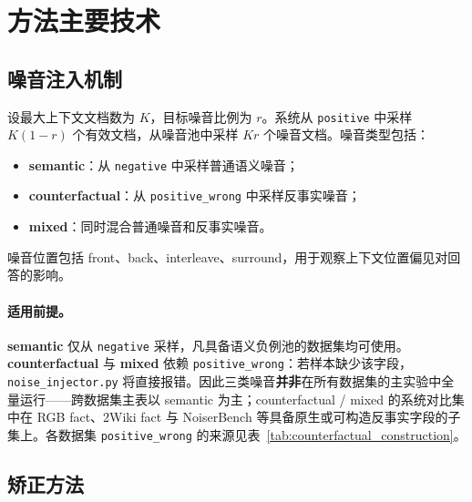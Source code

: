 \documentclass[UTF8,zihao=-4]{ctexart}
\begin{document}
\section{方法主要技术}

\subsection{噪音注入机制}
设最大上下文文档数为 $K$，目标噪音比例为 $r$。系统从 \texttt{positive} 中采样 $K(1-r)$ 个有效文档，从噪音池中采样 $Kr$ 个噪音文档。噪音类型包括：

\begin{itemize}
  \item \textbf{semantic}：从 \texttt{negative} 中采样普通语义噪音；
  \item \textbf{counterfactual}：从 \texttt{positive\_wrong} 中采样反事实噪音；
  \item \textbf{mixed}：同时混合普通噪音和反事实噪音。
\end{itemize}

噪音位置包括 front、back、interleave、surround，用于观察上下文位置偏见对回答的影响。

\paragraph{适用前提。} \textbf{semantic} 仅从 \texttt{negative} 采样，凡具备语义负例池的数据集均可使用。\textbf{counterfactual} 与 \textbf{mixed} 依赖 \texttt{positive\_wrong}：若样本缺少该字段，\texttt{noise\_injector.py} 将直接报错。因此三类噪音\textbf{并非}在所有数据集的主实验中全量运行——跨数据集主表以 semantic 为主；counterfactual / mixed 的系统对比集中在 RGB fact、2Wiki fact 与 NoiserBench 等具备原生或可构造反事实字段的子集上。各数据集 \texttt{positive\_wrong} 的来源见表~\ref{tab:counterfactual_construction}。

\subsection{矫正方法}
\end{document}
